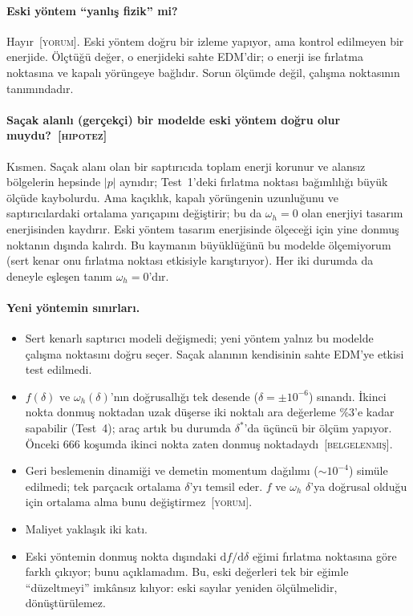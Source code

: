\documentclass[11pt,a4paper]{article}
\newcommand{\BEL}{\textsc{[belgelenmiş]}}
\newcommand{\YOR}{\textsc{[yorum]}}
\newcommand{\HIP}{\textsc{[hipotez]}}
\begin{document}
\paragraph{Eski yöntem ``yanlış fizik'' mi?} Hayır~\YOR. Eski yöntem doğru bir izleme yapıyor, ama kontrol
edilmeyen bir enerjide. Ölçtüğü değer, o enerjideki sahte EDM'dir; o enerji ise fırlatma noktasına ve kapalı
yörüngeye bağlıdır. Sorun ölçümde değil, çalışma noktasının tanımındadır.

\paragraph{Saçak alanlı (gerçekçi) bir modelde eski yöntem doğru olur muydu?~\HIP} Kısmen. Saçak alanı olan
bir saptırıcıda toplam enerji korunur ve alansız bölgelerin hepsinde $|p|$ aynıdır; Test~1'deki fırlatma
noktası bağımlılığı büyük ölçüde kaybolurdu. Ama kaçıklık, kapalı yörüngenin uzunluğunu ve saptırıcılardaki
ortalama yarıçapını değiştirir; bu da $\omega_h=0$ olan enerjiyi tasarım enerjisinden kaydırır. Eski yöntem
tasarım enerjisinde ölçeceği için yine donmuş noktanın dışında kalırdı. Bu kaymanın büyüklüğünü bu modelde
ölçemiyorum (sert kenar onu fırlatma noktası etkisiyle karıştırıyor). Her iki durumda da deneyle eşleşen
tanım $\omega_h=0$'dır.

\paragraph{Yeni yöntemin sınırları.}
\begin{itemize}[nosep]
\item Sert kenarlı saptırıcı modeli değişmedi; yeni yöntem yalnız bu modelde çalışma noktasını doğru seçer.
Saçak alanının kendisinin sahte EDM'ye etkisi test edilmedi.
\item $f(\delta)$ ve $\omega_h(\delta)$'nın doğrusallığı tek desende ($\delta=\pm10^{-6}$) sınandı. İkinci nokta
donmuş noktadan uzak düşerse iki noktalı ara değerleme \%3'e kadar sapabilir (Test~4); araç artık bu durumda
$\delta^*$'da üçüncü bir ölçüm yapıyor. Önceki 666 koşumda ikinci nokta zaten donmuş noktadaydı~\BEL.
\item Geri beslemenin dinamiği ve demetin momentum dağılımı ($\sim10^{-4}$) simüle edilmedi; tek parçacık
ortalama $\delta$'yı temsil eder. $f$ ve $\omega_h$ $\delta$'ya doğrusal olduğu için ortalama alma bunu
değiştirmez~\YOR.
\item Maliyet yaklaşık iki katı.
\item Eski yöntemin donmuş nokta dışındaki $\mathrm{d}f/\mathrm{d}\delta$ eğimi fırlatma noktasına göre
farklı çıkıyor; bunu açıklamadım. Bu, eski değerleri tek bir eğimle ``düzeltmeyi'' imkânsız kılıyor:
eski sayılar yeniden ölçülmelidir, dönüştürülemez.
\end{itemize}
\end{document}
